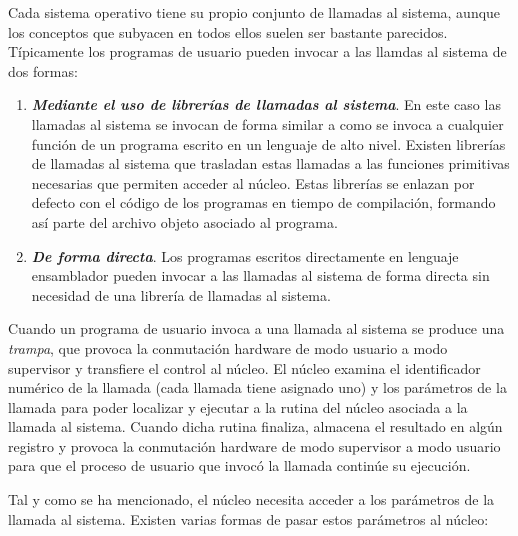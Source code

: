 \documentclass[12pt]{article}
\begin{document}
Cada sistema operativo tiene su propio conjunto de llamadas al sistema, aunque los conceptos que subyacen en todos ellos suelen ser bastante parecidos. Típicamente los programas de usuario pueden invocar a las llamdas al sistema de dos formas: 

\begin{enumerate}
\item \textbf{\textit{Mediante el uso de librerías de llamadas al sistema}}. En este caso las llamadas al sistema se invocan de forma similar a como se invoca a cualquier función de un programa escrito en un lenguaje de alto nivel. Existen librerías de llamadas al sistema que trasladan estas llamadas a las funciones primitivas necesarias que permiten acceder al núcleo. Estas librerías se enlazan por defecto con el código de los programas en tiempo de compilación, formando así parte del archivo objeto asociado al programa.

\item \textbf{\textit{De forma directa}}. Los programas escritos directamente en lenguaje ensamblador pueden invocar a las llamadas al sistema de forma directa sin necesidad de una librería de llamadas al sistema.
\end{enumerate} 

Cuando un programa de usuario invoca a una llamada al sistema se produce una \textit{trampa}, que provoca la conmutación hardware de modo usuario a modo supervisor y transfiere el control al núcleo. El núcleo examina el identificador numérico de la llamada (cada llamada tiene asignado uno) y los parámetros de la llamada para poder localizar y ejecutar a la rutina del núcleo asociada a la llamada al sistema. Cuando dicha rutina finaliza, almacena el resultado en algún registro y provoca la conmutación hardware de modo supervisor a modo usuario para que el proceso de usuario que invocó la llamada continúe su ejecución.

Tal y como se ha mencionado, el núcleo necesita acceder a los parámetros de la llamada al sistema. Existen varias formas de pasar estos parámetros al núcleo:
\end{document}

